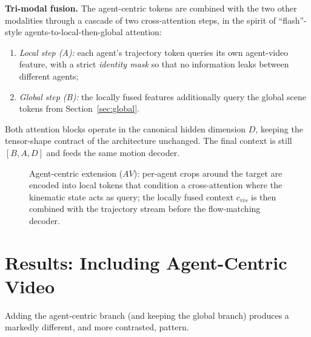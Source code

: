 \documentclass[11pt,a4paper]{article}
\begin{document}
\textbf{Tri-modal fusion.} The agent-centric tokens are combined with the two
other modalities through a cascade of two cross-attention steps, in the spirit
of ``flash''-style agents-to-local-then-global attention:
\begin{enumerate}
    \item \emph{Local step (A):} each agent's trajectory token queries its own
          agent-video feature, with a strict \emph{identity mask} so that no
          information leaks between different agents;
    \item \emph{Global step (B):} the locally fused features additionally query
          the global scene tokens from Section~\ref{sec:global}.
\end{enumerate}
Both attention blocks operate in the canonical hidden dimension $D$, keeping
the tensor-shape contract of the architecture unchanged. The final context is
still $[B, A, D]$ and feeds the same motion decoder.

\begin{figure}[htpb]
    \centering
    \resizebox{\textwidth}{!}{}
    \caption{Agent-centric extension ($AV$): per-agent crops around the target
    are encoded into local tokens that condition a cross-attention where the
    kinematic state acts as query; the locally fused context $c_{vis}$ is then
    combined with the trajectory stream before the flow-matching decoder.
    \label{fig:arch-agent}}
\end{figure}

\section{Results: Including Agent-Centric Video}
\label{sec:results-agent}

Adding the agent-centric branch (and keeping the global branch) produces a
markedly different, and more contrasted, pattern.
\end{document}
